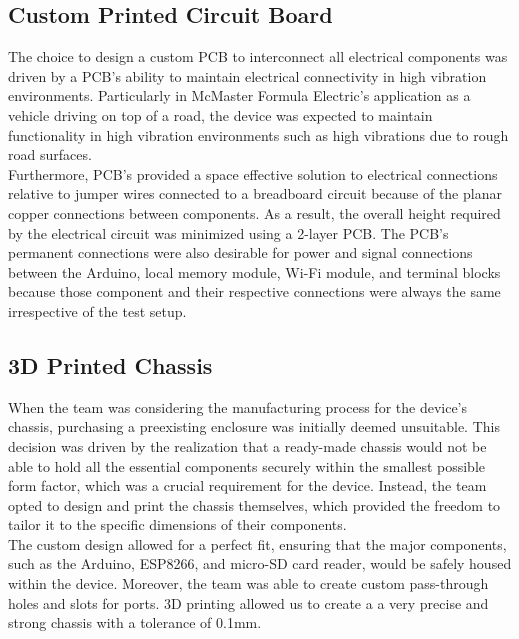 \documentclass[12pt]{article}
\begin{document}
\subsection{Custom Printed Circuit Board}
The choice to design a custom PCB to interconnect all electrical components was driven by a PCB's ability to maintain  electrical connectivity in high vibration environments. Particularly in McMaster Formula Electric's application as a vehicle driving on top of a road, the device was expected to maintain functionality in high vibration environments such as high vibrations due to rough road surfaces. \\

Furthermore, PCB's provided a space effective solution to electrical connections relative to jumper wires connected to a breadboard circuit because of the planar copper connections between components. As a result, the overall height required by the electrical circuit was minimized using a 2-layer PCB. The PCB's permanent connections were also desirable for power and signal connections between the Arduino, local memory module, Wi-Fi module, and terminal blocks because those component and their respective connections were always the same irrespective of the test setup. \\

\subsection{3D Printed Chassis}
When the team was considering the manufacturing process for the device's chassis, purchasing a preexisting enclosure was initially deemed unsuitable. This decision was driven by the realization that a ready-made chassis would not be able to hold all the essential components securely within the smallest possible form factor, which was a crucial requirement for the device. Instead, the team opted to design and print the chassis themselves, which provided the freedom to tailor it to the specific dimensions of their components.\\

The custom design allowed for a perfect fit, ensuring that the major components, such as the Arduino, ESP8266, and micro-SD card reader, would be safely housed within the device. Moreover, the team was able to create custom pass-through holes and slots for ports. 3D printing allowed us to create a a very precise and strong chassis with a tolerance of 0.1mm.\\
\end{document}
